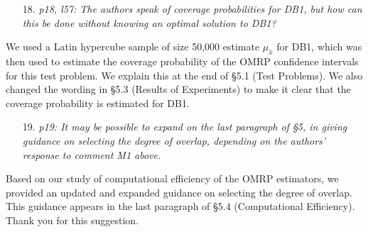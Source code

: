 \documentclass[11pt,notitlepage,onecolumn]{article}
\begin{document}
\begin{itemize}
\item[18.] \textit{p18, l57: The authors speak of coverage probabilities for DB1, but how can this be done without knowing an optimal solution to DB1?}
\end{itemize}

\noindent 
We used a Latin hypercube sample of size 50,000 estimate $\mu_{\hat{x}}$ for DB1, which was then used to estimate the coverage probability of the OMRP confidence intervals for this test problem.
We explain this at the end of \S 5.1 (Test Problems). 
We also changed the wording in \S 5.3 (Results of Experiments) to make it clear that the coverage probability is estimated for DB1. 
\medskip 


\begin{itemize}
\item[19.] \textit{p19: It may be possible to expand on the last paragraph of \S 5, in giving guidance on selecting the degree of overlap, depending on the authors' response to comment M1 above.}
\end{itemize}

\noindent 
Based on our study of computational efficiency of the OMRP estimators, we  provided an updated and expanded guidance on selecting the degree of overlap. 
This guidance appears in the last paragraph of \S 5.4 (Computational Efficiency). 
Thank you for this suggestion. 
\end{document}
